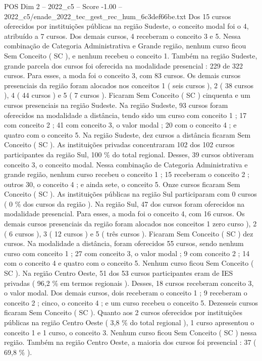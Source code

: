 \begin{textsample}{POS Dim 2 – 2022\_c5 – Score -1.00 – 2022\_c5/enade\_2022\_tec\_gest\_rec\_hum\_6c3def66be.txt}
Dos 15 cursos oferecidos por instituições públicas na região Sudeste, o conceito modal foi o 4, atribuído a 7 cursos.
Dos demais cursos, 4 receberam o conceito 3 e 5.
Nessa combinação de Categoria Administrativa e Grande região, nenhum curso ficou Sem Conceito ( SC ), e nenhum recebeu o conceito 1.
Também na região Sudeste, grande parcela dos cursos foi oferecida na modalidade presencial : 229 de 322 cursos.
Para esses, a moda foi o conceito 3, com 83 cursos.
Os demais cursos presenciais da região foram alocados nos conceitos 1 ( seis cursos ), 2 ( 38 cursos ), 4 ( 44 cursos ) e 5 ( 7 cursos ).
Ficaram Sem Conceito ( SC ) cinquenta e um cursos presenciais na região Sudeste.
Na região Sudeste, 93 cursos foram oferecidos na modalidade a distância, tendo sido um curso com conceito 1 ; 17 com conceito 2 ; 41 com conceito 3, o valor modal ; 20 com o conceito 4 ; e quatro com o conceito 5.
Na região Sudeste, dez cursos a distância ficaram Sem Conceito ( SC ).
As instituições privadas concentraram 102 dos 102 cursos participantes da região Sul, 100 \% do total regional.
Desses, 39 cursos obtiveram conceito 3, o conceito modal.
Nessa combinação de Categoria Administrativa e grande região, nenhum curso recebeu o conceito 1 ; 15 receberam o conceito 2 ; outros 30, o conceito 4 ; e ainda sete, o conceito 5.
Onze cursos ficaram Sem Conceito ( SC ).
As instituições públicas na região Sul participaram com 0 cursos ( 0 \% dos cursos da região ).
Na região Sul, 47 dos cursos foram oferecidos na modalidade presencial.
Para esses, a moda foi o conceito 4, com 16 cursos.
Os demais cursos presenciais da região foram alocados nos conceitos 1 zero curso ), 2 ( 6 cursos ), 3 ( 12 cursos ) e 5 ( três cursos ).
Ficaram Sem Conceito ( SC ) dez cursos.
Na modalidade a distância, foram oferecidos 55 cursos, sendo nenhum curso com conceito 1 ; 27 com conceito 3, o valor modal ; 9 com conceito 2 ; 14 com o conceito 4 e quatro com o conceito 5.
Nenhum curso ficou Sem Conceito ( SC ).
Na região Centro Oeste, 51 dos 53 cursos participantes eram de IES privadas ( 96,2 \% em termos regionais ).
Desses, 18 cursos receberam conceito 3, o valor modal.
Dos demais cursos, dois receberam o conceito 1 ; 9 receberam o conceito 2 ; cinco, o conceito 4 ; e um curso recebeu o conceito 5.
Dezesseis cursos ficaram Sem Conceito ( SC ).
Quanto aos 2 cursos oferecidos por instituições públicas na região Centro Oeste ( 3,8 \% do total regional ), 1 curso apresentou o conceito 1 e 1 curso, o conceito 3.
Nenhum curso ficou Sem Conceito ( SC ) nessa região.
Também na região Centro Oeste, a maioria dos cursos foi presencial : 37 ( 69,8 \% ).

\end{textsample}
